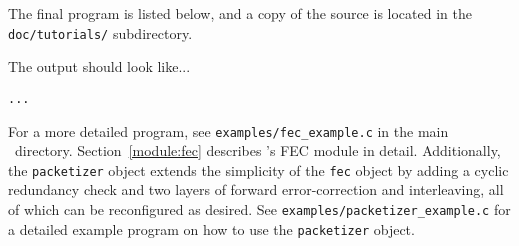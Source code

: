The final program is listed below,
and a copy of the source is located in the {\tt doc/tutorials/}
subdirectory.
%

%
The output should look like...
%
\begin{Verbatim}[fontsize=\small]
    ...
\end{Verbatim}

For a more detailed program, see {\tt examples/fec\_example.c} in the
main \liquid\ directory.
Section~\ref{module:fec} describes \liquid's FEC module in detail.
Additionally, the {\tt packetizer} object extends the simplicity of the
{\tt fec} object by adding a cyclic redundancy check and two layers of
forward error-correction and interleaving, all of which can be
reconfigured as desired.
See {\tt examples/packetizer\_example.c} for a detailed example program
on how to use the {\tt packetizer} object.


